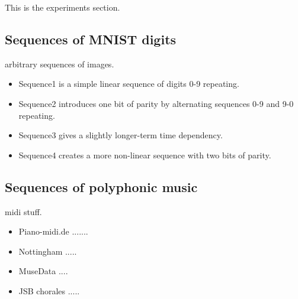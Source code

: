This is the experiments section.

\subsection{Sequences of MNIST digits}
	arbitrary sequences of images.
	\begin{itemize}
		\item Sequence1 is a simple linear sequence of digits 0-9 repeating.
		\item Sequence2 introduces one bit of parity by alternating sequences 0-9 and 9-0 repeating.
		\item Sequence3 gives a slightly longer-term time dependency.
		\item Sequence4 creates a more non-linear sequence with two bits of parity.
	\end{itemize}

\subsection{Sequences of polyphonic music}
	midi stuff.
	\begin{itemize}
		\item Piano-midi.de .......
		\item Nottingham .....
		\item MuseData ....
		\item JSB chorales .....
	\end{itemize}